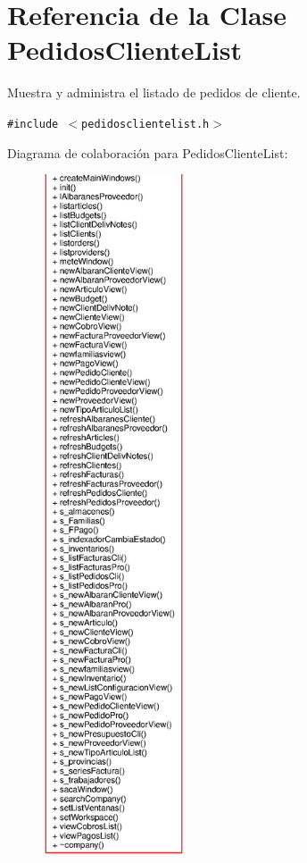 \section{Referencia de la Clase Pedidos\-Cliente\-List}
\label{classPedidosClienteList}
Muestra y administra el listado de pedidos de cliente.  


{\tt \#include $<$pedidosclientelist.h$>$}

Diagrama de colaboraci\'{o}n para Pedidos\-Cliente\-List:\begin{figure}[H]
\begin{center}
\leavevmode
\includegraphics[width=119pt]{classPedidosClienteList__coll__graph}
\end{center}
\end{figure}
